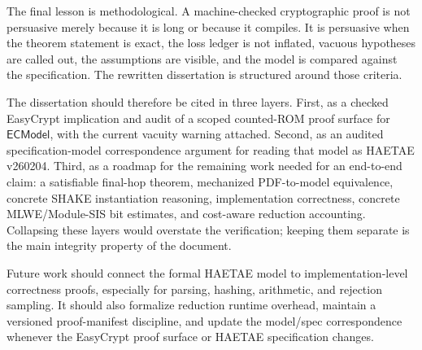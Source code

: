The final lesson is methodological.  A machine-checked cryptographic proof is
not persuasive merely because it is long or because it compiles.  It is
persuasive when the theorem statement is exact, the loss ledger is not inflated,
vacuous hypotheses are called out, the assumptions are visible, and the model is
compared against the specification.  The rewritten dissertation is structured
around those criteria.

The dissertation should therefore be cited in three layers.  First, as a checked
EasyCrypt implication and audit of a scoped counted-ROM proof surface for
\(\mathsf{ECModel}\), with the current vacuity warning attached.  Second, as an
audited specification-model correspondence argument for reading that model as
HAETAE v260204.  Third, as a roadmap for the remaining work needed for an
end-to-end claim: a satisfiable final-hop theorem, mechanized PDF-to-model
equivalence, concrete SHAKE instantiation reasoning, implementation correctness,
concrete MLWE/Module-SIS bit estimates, and cost-aware reduction accounting.
Collapsing these layers would overstate the verification; keeping them separate
is the main integrity property of the document.

Future work should connect the formal HAETAE model to implementation-level
correctness proofs, especially for parsing, hashing, arithmetic, and rejection
sampling.  It should also formalize reduction runtime overhead, maintain a
versioned proof-manifest discipline, and update the model/spec correspondence
whenever the EasyCrypt proof surface or HAETAE specification changes.
